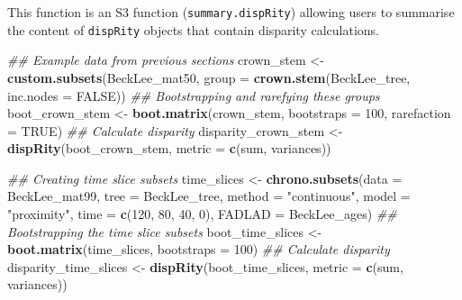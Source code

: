 \documentclass[]{book}
\newenvironment{Shaded}{\begin{snugshade}}{\end{snugshade}}
\newcommand{\CommentTok}[1]{\textcolor[rgb]{0.56,0.35,0.01}{\textit{#1}}}
\newcommand{\DataTypeTok}[1]{\textcolor[rgb]{0.13,0.29,0.53}{#1}}
\newcommand{\DecValTok}[1]{\textcolor[rgb]{0.00,0.00,0.81}{#1}}
\newcommand{\KeywordTok}[1]{\textcolor[rgb]{0.13,0.29,0.53}{\textbf{#1}}}
\newcommand{\NormalTok}[1]{#1}
\newcommand{\OtherTok}[1]{\textcolor[rgb]{0.56,0.35,0.01}{#1}}
\newcommand{\StringTok}[1]{\textcolor[rgb]{0.31,0.60,0.02}{#1}}
\begin{document}
This function is an S3 function (\texttt{summary.dispRity}) allowing users to summarise the content of \texttt{dispRity} objects that contain disparity calculations.

\begin{Shaded}
\begin{Highlighting}[]
\CommentTok{## Example data from previous sections}
\NormalTok{crown_stem <-}\StringTok{ }\KeywordTok{custom.subsets}\NormalTok{(BeckLee_mat50,}
                             \DataTypeTok{group =} \KeywordTok{crown.stem}\NormalTok{(BeckLee_tree,}
                             \DataTypeTok{inc.nodes =} \OtherTok{FALSE}\NormalTok{))}
\CommentTok{## Bootstrapping and rarefying these groups}
\NormalTok{boot_crown_stem <-}\StringTok{ }\KeywordTok{boot.matrix}\NormalTok{(crown_stem, }\DataTypeTok{bootstraps =} \DecValTok{100}\NormalTok{,}
                               \DataTypeTok{rarefaction =} \OtherTok{TRUE}\NormalTok{)}
\CommentTok{## Calculate disparity}
\NormalTok{disparity_crown_stem <-}\StringTok{ }\KeywordTok{dispRity}\NormalTok{(boot_crown_stem,}
                                 \DataTypeTok{metric =} \KeywordTok{c}\NormalTok{(sum, variances))}

\CommentTok{## Creating time slice subsets}
\NormalTok{time_slices <-}\StringTok{ }\KeywordTok{chrono.subsets}\NormalTok{(}\DataTypeTok{data =}\NormalTok{ BeckLee_mat99,}
                              \DataTypeTok{tree =}\NormalTok{ BeckLee_tree,}
                              \DataTypeTok{method =} \StringTok{"continuous"}\NormalTok{,}
                              \DataTypeTok{model =} \StringTok{"proximity"}\NormalTok{,}
                              \DataTypeTok{time =} \KeywordTok{c}\NormalTok{(}\DecValTok{120}\NormalTok{, }\DecValTok{80}\NormalTok{, }\DecValTok{40}\NormalTok{, }\DecValTok{0}\NormalTok{),}
                              \DataTypeTok{FADLAD =}\NormalTok{ BeckLee_ages)}
\CommentTok{## Bootstrapping the time slice subsets}
\NormalTok{boot_time_slices <-}\StringTok{ }\KeywordTok{boot.matrix}\NormalTok{(time_slices, }\DataTypeTok{bootstraps =} \DecValTok{100}\NormalTok{)}
\CommentTok{## Calculate disparity}
\NormalTok{disparity_time_slices <-}\StringTok{ }\KeywordTok{dispRity}\NormalTok{(boot_time_slices,}
                                  \DataTypeTok{metric =} \KeywordTok{c}\NormalTok{(sum, variances))}


\end{Highlighting}
\end{Shaded}
\end{document}
